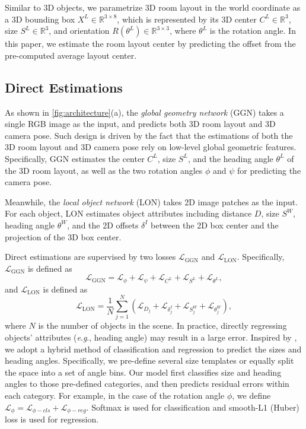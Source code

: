\documentclass{article}
\makeatletter
\newcommand{\eg}{\textit{e}.\textit{g}.\@\xspace}
\makeatother
\begin{document}
Similar to 3D objects, we parametrize 3D room layout in the world coordinate as a 3D bounding box $X^L \in \mathbb{R}^{3 \times 8}$, which is represented by its 3D center $C^L \in \mathbb{R}^3$, size $S^L \in \mathbb{R}^3$, and orientation $R(\theta^L) \in \mathbb{R}^{3 \times 3}$, where $\theta^L$ is the rotation angle. In this paper, we estimate the room layout center by predicting the offset from the pre-computed average layout center.

\subsection{Direct Estimations}

As shown in \autoref{fig:architecture}(a), the \emph{global geometry network} (GGN) takes a single RGB image as the input, and predicts both 3D room layout and 3D camera pose. Such design is driven by the fact that the estimations of both the 3D room layout and 3D camera pose rely on low-level global geometric features. Specifically, GGN estimates the center $C^L$, size $S^L$, and the heading angle $\theta^L$ of the 3D room layout, as well as the two rotation angles $\phi$ and $\psi$ for predicting the camera pose.

Meanwhile, the \emph{local object network} (LON) takes 2D image patches as the input. For each object, LON estimates object attributes including distance $D$, size $S^W$, heading angle $\theta^W$, and the 2D offsets $\delta^I$ between the 2D box center and the projection of the 3D box center.

Direct estimations are supervised by two losses $\mathcal{L}_\text{GGN}$ and $\mathcal{L}_\text{LON}$. Specifically, $\mathcal{L}_\text{GGN}$ is defined as
\begin{equation}
    \mathcal{L}_\text{GGN} = \mathcal{L}_{\phi} + \mathcal{L}_{\psi} + \mathcal{L}_{C^L} + \mathcal{L}_{S^L} + \mathcal{L}_{\theta^L},
\end{equation}
and $\mathcal{L}_\text{LON}$ is defined as
\begin{equation}
    \mathcal{L}_\text{LON} = \frac{1}{N} \sum_{j=1}^{N} (\mathcal{L}_{D_j} + \mathcal{L}_{\delta^I_j} + \mathcal{L}_{S_j^W} + \mathcal{L}_{\theta_j^W}),
\end{equation}
where $N$ is the number of objects in the scene. In practice, directly regressing objects' attributes (\eg, heading angle) may result in a large error. Inspired by \citep{ren2015faster,mousavian20173d,qi2017frustum}, we adopt a hybrid method of classification and regression to predict the sizes and heading angles. Specifically, we pre-define several size templates or equally split the space into a set of angle bins. Our model first classifies size and heading angles to those pre-defined categories, and then predicts residual errors within each category. For example, in the case of the rotation angle $\phi$, we define $\mathcal{L}_{\phi} = \mathcal{L}_{\phi-cls} + \mathcal{L}_{\phi-reg}$. Softmax is used for classification and smooth-L1 (Huber) loss is used for regression.
\end{document}
